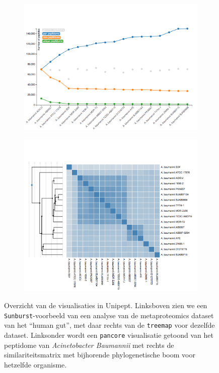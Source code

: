 \begin{figure}
    \begin{subfigure}{0.45\textwidth}
        \centering
        \includegraphics[width=\textwidth]{includes/visoverzicht4}
        \caption{}
        \label{fig:overzicht4}
    \end{subfigure}
    \begin{subfigure}{0.45\textwidth}
        \centering
        \includegraphics[width=\textwidth]{includes/visoverzicht5}
        \caption{}
        \label{fig:overzicht5}
    \end{subfigure}
    \caption{Overzicht van de visualisaties in Unipept. Linksboven zien we een 
    \texttt{Sunburst}-voorbeeld van een analyse van de metaproteomics dataset 
    van het ``human gut'', met daar rechts van de \texttt{treemap} voor 
    dezelfde dataset. Linksonder wordt een \texttt{pancore} visualisatie 
    getoond van het peptidome van \textit{Acinetobacter Baumannii} met rechts 
    de similariteitsmatrix met bijhorende phylogenetische boom voor hetzelfde 
    organisme.}
    \label{fig:overzicht}
\end{figure}

